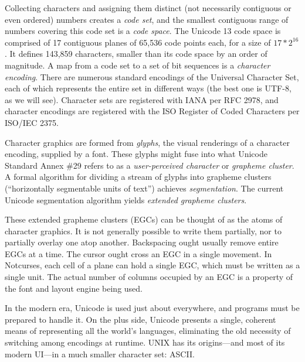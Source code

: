 Collecting characters and assigning them distinct (not necessarily contiguous or
even ordered) numbers creates a \textit{code set}, and the smallest contiguous
range of numbers covering this code set is a \textit{code space}. The Unicode 13
code space is comprised of 17 contiguous planes of 65,536 code points each, for
a size of $17*2^{16}$. It defines 143,859 characters, smaller than its
code space by an order of magnitude. A map from a code set to a set of bit
sequences is a \textit{character encoding}. There are numerous standard
encodings of the Universal Character Set, each of which represents the entire
set in different ways (the best one is UTF-8, as we will see). Character sets
are registered with IANA per RFC 2978\cite{rfc2978}, and character encodings
are registered with the ISO Register of Coded Characters per ISO/IEC 2375\cite{iso2375}.

Character graphics are formed from \textit{glyphs}, the visual renderings of a
character encoding, supplied by a font. These glyphs might fuse into what
Unicode Standard Annex \#29\cite{annex29} refers to as a \textit{user-perceived
character} or \textit{grapheme cluster}. A formal algorithm for dividing a
stream of glyphs into grapheme clusters (``horizontally segmentable units of
text\cite{meaningcodepoints}'') achieves \textit{segmentation}. The current
Unicode segmentation algorithm yields \textit{extended grapheme clusters}.

These extended grapheme clusters (EGCs) can be thought of as the atoms of
character graphics. It is not generally possible to write them partially, nor
to partially overlay one atop another. Backspacing ought usually remove entire EGCs
at a time. The cursor ought cross an EGC in a single movement. In Notcurses,
each cell of a plane can hold a single EGC, which must be written as a single
unit. The actual number of columns occupied by an EGC is a property of the font
and layout engine being used.

In the modern era, Unicode is used just about everywhere, and programs must be
prepared to handle it. On the plus side, Unicode presents a single, coherent
means of representing all the world's languages, eliminating the old necessity
of switching among encodings at runtime. UNIX has its origins---and most of its
modern UI---in a much smaller character set: ASCII.

